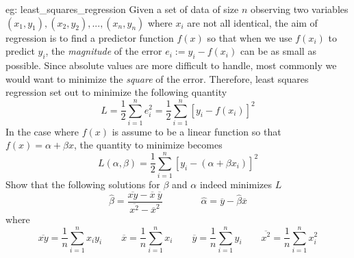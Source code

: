 \begin{eg}[]{eg: least_squares_regression}
    Given a set of data of size $n$ observing two variables $(x_1, y_1), (x_2, y_2), ..., (x_n, y_n)$ where $x_i$ are not all identical, the aim of regression is to find a predictor function $f(x)$ so that when we use $f(x_i)$ to predict $y_i$, the \textit{magnitude} of the error $e_i := y_i-f(x_i)$ can be as small as possible.  Since absolute values are more difficult to handle, most commonly we would want to minimize the \textit{square} of the error.  Therefore, least squares regression set out to minimize the following quantity
    \[L = \frac{1}{2}\sum_{i=1}^n e_i^2= \frac{1}{2}\sum_{i=1}^n[y_i - f(x_i)]^2\]
    In the case where $f(x)$ is assume to be a linear function so that $f(x) = \alpha + \beta x$, the quantity to minimize becomes
    \[L(\alpha, \beta) = \frac{1}{2}\sum_{i=1}^n[y_i - (\alpha + \beta x_i)]^2\]
    Show that the following solutions for $\beta$ and $\alpha$ indeed minimizes $L$
    \[\hat{\beta} = \frac{\overline{xy} - \overline{x}~\overline{y}}{\overline{x^2}-\overline{x}^2} \qquad\qquad \hat{\alpha} = \overline{y} - \hat{\beta}\overline{x}\]
    where
    \[\overline{xy} = \frac{1}{n}\sum_{i=1}^n x_i y_i \qquad \overline{x} = \frac{1}{n}\sum_{i=1}^n x_i \qquad \overline{y} = \frac{1}{n}\sum_{i=1}^n y_i  \qquad \overline{x^2} = \frac{1}{n}\sum_{i=1}^n x_i^2\]
\end{eg}


